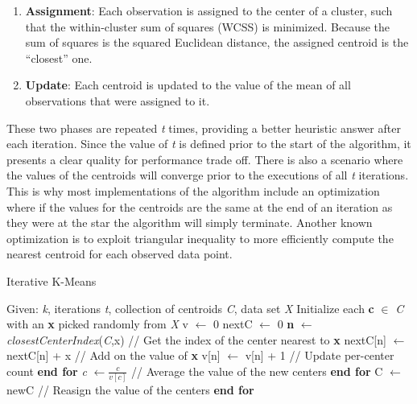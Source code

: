 \documentclass{l4proj}
\begin{document}
\begin{enumerate}
\item \textbf{Assignment}: Each observation is assigned to the center of a cluster, such that the within-cluster sum of squares (WCSS) is minimized. Because the sum of squares is the squared Euclidean distance, the assigned centroid is the ``closest'' one.
\item \textbf{Update}: Each centroid is updated to the value of the mean of all observations that were assigned to it. 
\end{enumerate}

These two phases are repeated \textit{t} times, providing a better heuristic answer after each iteration. Since the value of \textit{t} is defined prior to the start of the algorithm, it presents a clear quality for performance trade off. There is also a scenario where the values of the centroids will converge prior to the executions of all \textit{t} iterations. This is why most implementations of the algorithm include an optimization where if the values for the centroids are the same at the end of an iteration as they were at the star the algorithm will simply terminate. Another known optimization is to exploit triangular inequality to more efficiently compute the nearest centroid for each observed data point\cite{Triangle}. 

\begin{algorithm}
\caption{Iterative K-Means}\label{iterative}
\begin{algorithmic}[1]
\State Given: \textit{k}, iterations \textit{t}, collection of centroids \textit{C}, data set \textit{X}
\State Initialize each \textbf{c} $\in$ \textit{C} with an \textbf{x} picked randomly from \textit{X}
    \State v $\gets$ 0
    \State nextC $\gets$ 0
        \State \textbf{n} $\gets$ \textit{closestCenterIndex}(\textit{C},x) \hspace{0.4cm} // Get the index of the center nearest to \textbf{x}
        \State nextC[n] $\gets$ nextC[n] + x \hspace{1cm} // Add on the value of \textbf{x}
        \State v[n] $\gets$ v[n] + 1 \hspace{2.4cm} // Update per-center count
    \EndFor
    \State \textbf{end for}
        \State \textit{c} $\gets \frac{\textit{c}}{v[\textit{c}]}$ \hspace{1cm} // Average the value of the new centers
    \EndFor
    \State \textbf{end for}
    \State C $\gets$ newC \hspace{1.2cm} // Reasign the value of the centers
\EndFor
\State \textbf{end for}
\end{algorithmic}
\end{algorithm}
\end{document}
